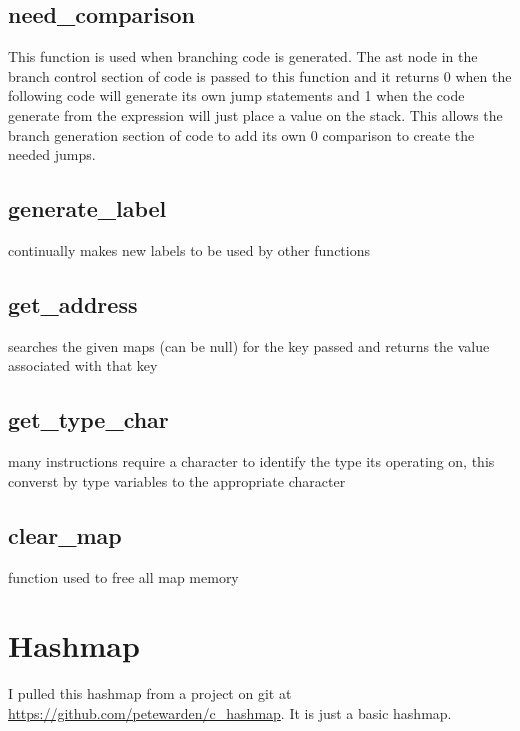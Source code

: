 \documentclass[11pt]{article}
\begin{document}
        \subsection{need\_comparison}
            This function is used when branching code is generated. The 
            ast node in the branch control section of code is passed to this
            function and it returns 0 when the following code will generate
            its own jump statements and 1 when the code generate from the
            expression will just place a value on the stack. This allows 
            the branch generation section of code to add its own 0 comparison
            to create the needed jumps.
    
        \subsection{generate\_label}
            continually makes new labels to be used by other functions

        \subsection{get\_address}
            searches the given maps (can be null) for the key passed
            and returns the value associated with that key

        \subsection{get\_type\_char}
            many instructions require a character to identify the type
            its operating on, this converst by type variables to the 
            appropriate character

        \subsection{clear\_map}
            function used to free all map memory

    \section{Hashmap}
        I pulled this hashmap from a project on git at \url{https://github.com/petewarden/c\_hashmap}.
        It is just a basic hashmap.
\end{document}
